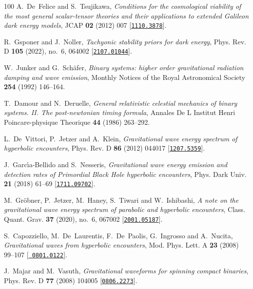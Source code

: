 \begin{thebibliography}{100}
A.~De~Felice and S.~Tsujikawa,  {\em {Conditions for the cosmological viability
  of the most general scalar-tensor theories and their applications to extended
  Galileon dark energy models}}, JCAP {\bf 02} (2012) 007
  [\href{http://www.arXiv.org/abs/1110.3878}{{\tt 1110.3878}}].

R.~Gsponer and J.~Noller,  {\em {Tachyonic stability priors for dark energy}},
  Phys. Rev. D {\bf 105} (2022), no.~6, 064002
  [\href{http://www.arXiv.org/abs/2107.01044}{{\tt 2107.01044}}].

W.~Junker and G.~Sch{\"a}fer,  {\em Binary systems: higher order gravitational
  radiation damping and wave emission}, Monthly Notices of the Royal
  Astronomical Society {\bf 254} (1992) 146--164.

T.~Damour and N.~Deruelle,  {\em General relativistic celestial mechanics of
  binary systems. II. The post-newtonian timing formula}, Annales De L Institut
  Henri Poincare-physique Theorique {\bf 44} (1986) 263--292.

L.~De~Vittori, P.~Jetzer and A.~Klein,  {\em {Gravitational wave energy
  spectrum of hyperbolic encounters}}, Phys. Rev. D {\bf 86} (2012) 044017
  [\href{http://www.arXiv.org/abs/1207.5359}{{\tt 1207.5359}}].

J.~Garc\'\i{}a-Bellido and S.~Nesseris,  {\em {Gravitational wave energy
  emission and detection rates of Primordial Black Hole hyperbolic
  encounters}}, Phys. Dark Univ. {\bf 21} (2018) 61--69
  [\href{http://www.arXiv.org/abs/1711.09702}{{\tt 1711.09702}}].

M.~Gr\"obner, P.~Jetzer, M.~Haney, S.~Tiwari and W.~Ishibashi,  {\em {A note on
  the gravitational wave energy spectrum of parabolic and hyperbolic
  encounters}}, Class. Quant. Grav. {\bf 37} (2020), no.~6, 067002
  [\href{http://www.arXiv.org/abs/2001.05187}{{\tt 2001.05187}}].

S.~Capozziello, M.~De~Laurentis, F.~De~Paolis, G.~Ingrosso and A.~Nucita,  {\em
  {Gravitational waves from hyperbolic encounters}}, Mod. Phys. Lett. A {\bf
  23} (2008) 99--107 [\href{http://www.arXiv.org/abs/0801.0122}{{\tt
  0801.0122}}].

J.~Majar and M.~Vasuth,  {\em {Gravitational waveforms for spinning compact
  binaries}}, Phys. Rev. D {\bf 77} (2008) 104005
  [\href{http://www.arXiv.org/abs/0806.2273}{{\tt 0806.2273}}].


\end{thebibliography}
